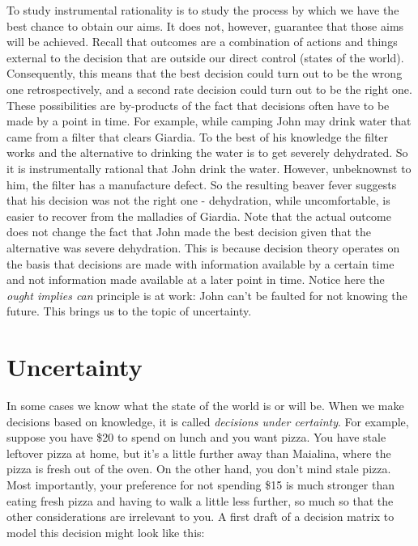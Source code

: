 \documentclass[]{tufte-book}
\begin{document}
To study instrumental rationality is to study the process by which we have the best chance to obtain our aims. It does not, however, guarantee that those aims will be achieved. Recall that outcomes are a combination of actions and things external to the decision that are outside our direct control (states of the world). Consequently, this means that the best decision could turn out to be the wrong one retrospectively, and a second rate decision could turn out to be the right one. These possibilities are by-products of the fact that decisions often have to be made by a point in time. For example, while camping John may drink water that came from a filter that clears Giardia. To the best of his knowledge the filter works and the alternative to drinking the water is to get severely dehydrated. So it is instrumentally rational that John drink the water. However, unbeknownst to him, the filter has a manufacture defect. So the resulting beaver fever suggests that his decision was not the right one - dehydration, while uncomfortable, is easier to recover from the malladies of Giardia. Note that the actual outcome does not change the fact that John made the best decision given that the alternative was severe dehydration. This is because decision theory operates on the basis that decisions are made with information available by a certain time and not information made available at a later point in time. Notice here the \emph{ought implies can} principle is at work: John can't be faulted for not knowing the future. This brings us to the topic of uncertainty.

\hypertarget{uncertainty}{%
\section{Uncertainty}\label{uncertainty}}

In some cases we know what the state of the world is or will be. When we make decisions based on knowledge, it is called \emph{decisions under certainty}. For example, suppose you have \$20 to spend on lunch and you want pizza. You have stale leftover pizza at home, but it's a little further away than Maialina, where the pizza is fresh out of the oven. On the other hand, you don't mind stale pizza. Most importantly, your preference for not spending \$15 is much stronger than eating fresh pizza and having to walk a little less further, so much so that the other considerations are irrelevant to you. A first draft of a decision matrix to model this decision might look like this:
\end{document}
